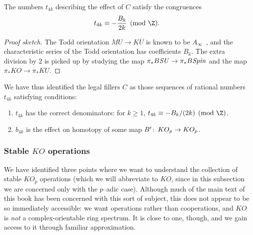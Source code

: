 \begin{corollary}
The numbers $t_{4k}$ describing the effect of $C$ satisfy the congruences \[t_{4k} \equiv -\frac{B_k}{2k} \pmod{\Z}.\]
\end{corollary}
\begin{proof}[Proof sketch]
The Todd orientation $MU \to KU$ is known to be $A_\infty$~\cite[Theorem V.4.1]{EKMM}, and the characteristic series of the Todd orientation has coefficients $B_k$.  The extra division by $2$ is picked up by studying the map $\pi_* B\mathit{SU} \to \pi_* B\mathit{Spin}$ and the map $\pi_* KO \to \pi_* KU$.
\end{proof}

We have thus identified the legal fillers $C$ as those sequences of rational numbers $t_{4k}$ satisfying conditions:
\begin{enumerate}
    \item $t_{4k}$ has the correct denominators: for $k \ge 1$, $t_{4k} \equiv -B_k/(2k) \pmod{\Z}$.
    \item $b_{4k}$ is the effect on homotopy of some map $B'\colon\thinspace KO_p \to KO_p$.
\end{enumerate}


\subsubsection{Stable $KO$ operations}
\newcommand{\cts}{\mathrm{cts}}

We have identified three points where we want to understand the collection of stable $KO_p$ operations (which we will abbreviate to $KO$, since in this subsection we are concerned only with the $p$--adic case).  Although much of the main text of this book has been concerned with this sort of subject, this does not appear to be so immediately accessible: we want operations rather than cooperations, and $KO$ is \emph{not} a complex-orientable ring spectrum.  It is close to one, though, and we gain access to it through familiar approximation.


